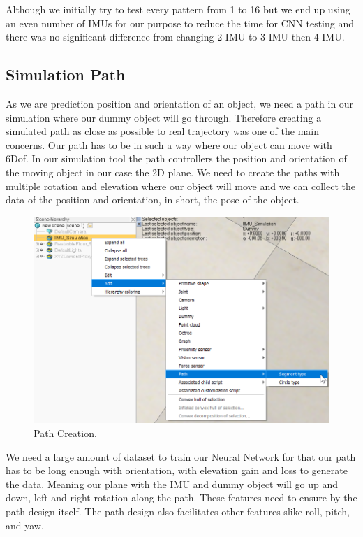 Although we initially try to test every pattern from 1 to 16 but we end up using an even number of IMUs for our purpose to reduce the time for CNN testing and there was no significant difference from changing 2 IMU to 3 IMU then 4 IMU. 


\subsection{Simulation Path}

As we are prediction position and orientation of an object, we need a path in our simulation where our dummy object will go through. Therefore creating a simulated path as close as possible to real trajectory was one of the main concerns. Our path has to be in such a way where our object can move with 6Dof. In our simulation tool the path controllers the position and orientation of the moving object in our case the 2D plane. We need to create the paths with multiple rotation and elevation where our object will move and we can collect the data of the position and orientation, in short, the pose of the object.

\begin{figure}[h]
  \centering
    \includegraphics[width=\linewidth]{figures/pathCreation.png}
    \caption{Path Creation.}
\label{fig:Path_creation}
\end{figure}


We need a large amount of dataset to train our Neural Network for that our path has to be long enough with orientation, with elevation gain and loss to generate the data. Meaning our plane with the IMU and dummy object will go up and down, left and right rotation along the path. These features need to ensure by the path design itself. The path design also facilitates other features slike roll, pitch, and yaw. 

